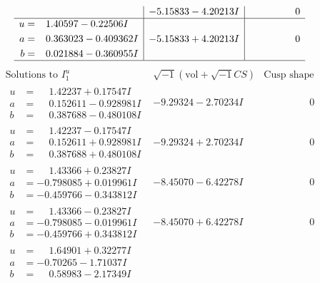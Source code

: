 \documentclass[1p]{elsarticle_modified}
\theoremstyle{definition}
\newcommand{\I}{\sqrt{-1}}
\begin{document}
$$\begin{array}{c|c|c}
 & -5.15833 - 4.20213 I & \phantom{-0.000000 } 0 \\ \hline\begin{aligned}
u &= \phantom{-}1.40597 - 0.22506 I \\
a &= \phantom{-}0.363023 - 0.409362 I \\
b &= \phantom{-}0.021884 - 0.360955 I\end{aligned}
 & -5.15833 + 4.20213 I & \phantom{-0.000000 } 0\\
 \hline 
 \end{array}$$\newpage$$\begin{array}{c|c|c}  
\text{Solutions to }I^u_{1}& \I (\text{vol} + \sqrt{-1}CS) & \text{Cusp shape}\\
 \hline 
\begin{aligned}
u &= \phantom{-}1.42237 + 0.17547 I \\
a &= \phantom{-}0.152611 - 0.928981 I \\
b &= \phantom{-}0.387688 - 0.480108 I\end{aligned}
 & -9.29324 - 2.70234 I & \phantom{-0.000000 } 0 \\ \hline\begin{aligned}
u &= \phantom{-}1.42237 - 0.17547 I \\
a &= \phantom{-}0.152611 + 0.928981 I \\
b &= \phantom{-}0.387688 + 0.480108 I\end{aligned}
 & -9.29324 + 2.70234 I & \phantom{-0.000000 } 0 \\ \hline\begin{aligned}
u &= \phantom{-}1.43366 + 0.23827 I \\
a &= -0.798085 + 0.019961 I \\
b &= -0.459766 - 0.343812 I\end{aligned}
 & -8.45070 - 6.42278 I & \phantom{-0.000000 } 0 \\ \hline\begin{aligned}
u &= \phantom{-}1.43366 - 0.23827 I \\
a &= -0.798085 - 0.019961 I \\
b &= -0.459766 + 0.343812 I\end{aligned}
 & -8.45070 + 6.42278 I & \phantom{-0.000000 } 0 \\ \hline\begin{aligned}
u &= \phantom{-}1.64901 + 0.32277 I \\
a &= -0.70265 - 1.71037 I \\
b &= \phantom{-}0.58983 - 2.17349 I\end{aligned}

\end{array}$$
\end{document}

